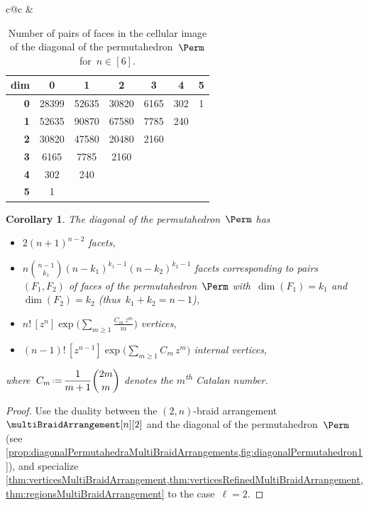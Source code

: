 \documentclass{amsart}
\newtheorem{corollary}[theorem]{Corollary}
\theoremstyle{definition}
\newcommand{\eqdef}{\mbox{\,\raisebox{0.2ex}{\scriptsize\ensuremath{\mathrm:}}\ensuremath{=}\,}} %
\newcommand{\ordinal}{\textsuperscript{th}} %
\begin{document}
{\begin{table}
{\begin{tabular}{c@{\quad}c}
			&
			\begin{tabular}[t]{r|cccccc}
				\textbf{dim} & \textbf{0} & \textbf{1} & \textbf{2} & \textbf{3} & \textbf{4} & \textbf{5} \\
				\hline
				\textbf{0} & 28399 & 52635 & 30820 & 6165 & 302 & 1 \\
				\textbf{1} & 52635 & 90870 & 67580 & 7785 & 240 & \\
				\textbf{2} & 30820 & 47580 & 20480 & 2160 & & \\
				\textbf{3} & 6165 & 7785 & 2160 & && \\
				\textbf{4} & 302 & 240 & & &&\\
				\textbf{5} & 1 & & & &&
			\end{tabular}
		\end{tabular}
	}
	\caption{Number of pairs of faces in the cellular image of the diagonal of the permutahedron~$\Perm$ for~$n \in [6]$.}
	\label{table:enumerationDiagonalPermutahedra2}
\end{table}
}

\begin{corollary}
\label{coro:enumerationDiagonalPermutahedra}
The diagonal of the permutahedron~$\Perm$ has 
\begin{itemize}
\item $2 (n + 1)^{n-2}$ facets,
\item $n \binom{n-1}{k_1} (n-k_1)^{k_1-1} (n-k_2)^{k_2-1}$ facets corresponding to pairs~$(F_1, F_2)$ of faces of the permutahedron~$\Perm$ with~$\dim(F_1) = k_1$ and~$\dim(F_2) = k_2$ (thus~$k_1 + k_2 = n-1$),
\item $\displaystyle n! \, [z^n] \exp \bigg( \sum_{m \ge 1} \frac{C_m \, z^m}{m} \bigg)$ vertices,
\item $\displaystyle (n-1)! \, [z^{n-1}] \exp \bigg( \sum_{m \ge 1} C_m \, z^m \bigg)$ internal vertices,
\end{itemize}
where~$\displaystyle C_m \eqdef \frac{1}{m+1} \binom{2m}{m}$ denotes the $m$\ordinal{} Catalan number.
\end{corollary}

\begin{proof}
Use the duality between the $(2,n)$-braid arrangement~$\multiBraidArrangement[n][2]$ and the diagonal of the permutahedron~$\Perm$ (see \cref{prop:diagonalPermutahedraMultiBraidArrangements,fig:diagonalPermutahedron1}), and specialize \cref{thm:verticesMultiBraidArrangement,thm:verticesRefinedMultiBraidArrangement,thm:regionsMultiBraidArrangement} to the case~$\ell = 2$.
\end{proof}
\end{document}
